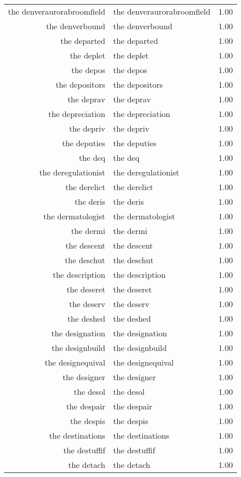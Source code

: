 \begin{table}[ht]
\begin{tabular}{rlr}
  the denveraurorabroomfield & the denveraurorabroomfield & 1.00 \\ 
  the denverbound & the denverbound & 1.00 \\ 
  the departed & the departed & 1.00 \\ 
  the deplet & the deplet & 1.00 \\ 
  the depos & the depos & 1.00 \\ 
  the depositors & the depositors & 1.00 \\ 
  the deprav & the deprav & 1.00 \\ 
  the depreciation & the depreciation & 1.00 \\ 
  the depriv & the depriv & 1.00 \\ 
  the deputies & the deputies & 1.00 \\ 
  the deq & the deq & 1.00 \\ 
  the deregulationist & the deregulationist & 1.00 \\ 
  the derelict & the derelict & 1.00 \\ 
  the deris & the deris & 1.00 \\ 
  the dermatologist & the dermatologist & 1.00 \\ 
  the dermi & the dermi & 1.00 \\ 
  the descent & the descent & 1.00 \\ 
  the deschut & the deschut & 1.00 \\ 
  the description & the description & 1.00 \\ 
  the deseret & the deseret & 1.00 \\ 
  the deserv & the deserv & 1.00 \\ 
  the deshed & the deshed & 1.00 \\ 
  the designation & the designation & 1.00 \\ 
  the designbuild & the designbuild & 1.00 \\ 
  the designequival & the designequival & 1.00 \\ 
  the designer & the designer & 1.00 \\ 
  the desol & the desol & 1.00 \\ 
  the despair & the despair & 1.00 \\ 
  the despis & the despis & 1.00 \\ 
  the destinations & the destinations & 1.00 \\ 
  the destuffif & the destuffif & 1.00 \\ 
  the detach & the detach & 1.00 \\ 

\end{tabular}
\end{table}
